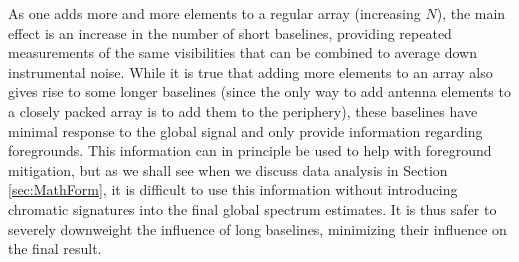 \documentclass[twocolumn,apj,numberedappendix]{emulateapj}
\begin{document}
As one adds more and more elements to a regular array (increasing $N$), the main effect is an increase in the number of short baselines, providing repeated measurements of the same visibilities that can be combined to average down instrumental noise. While it is true that adding more elements to an array also gives rise to some longer baselines (since the only way to add antenna elements to a closely packed array is to add them to the periphery), these baselines have minimal response to the global signal and only provide information regarding foregrounds. This information can in principle be used to help with foreground mitigation, but as we shall see when we discuss data analysis in Section \ref{sec:MathForm}, it is difficult to use this information without introducing chromatic signatures into the final global spectrum estimates. It is thus safer to severely downweight the influence of long baselines, minimizing their influence on the final result.
\end{document}
